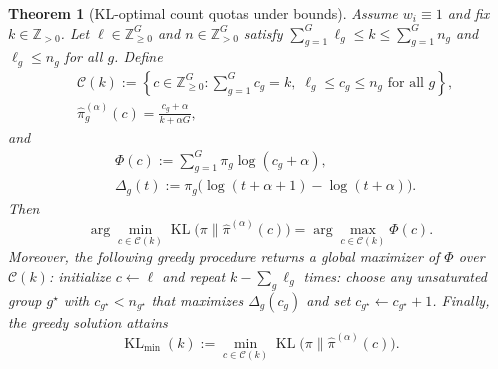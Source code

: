 \documentclass[10pt,journal]{IEEEtran}
\newcommand{\1}{\mathbf{1}}
\DeclareMathOperator{\KL}{KL}
\theoremstyle{ieeethm}
\newtheorem{theorem}{Theorem}
\begin{document}
\begin{theorem}[KL-optimal count quotas under bounds]
\label{thm:quota}
Assume $w_i\equiv 1$ and fix $k\in\mathbb{Z}_{>0}$. Let $\ell\in\mathbb{Z}_{\ge 0}^G$ and $n\in\mathbb{Z}_{>0}^G$
satisfy $\sum_{g=1}^G \ell_g \le k \le \sum_{g=1}^G n_g$ and $\ell_g\le n_g$ for all $g$.
Define
\begin{equation*}
\begin{aligned}
&\mathcal{C}(k):=
\left\{
c\in\mathbb{Z}_{\ge 0}^G :
\sum_{g=1}^G c_g=k,\;
\ell_g\le c_g\le n_g \text{ for all } g
\right\},
\\
&\hat\pi_g^{(\alpha)}(c)=\frac{c_g+\alpha}{k+\alpha G},
\end{aligned}
\end{equation*}
and
\begin{equation*}
\begin{aligned}
&\Phi(c):=\sum_{g=1}^G \pi_g\log(c_g+\alpha),
\\
&\Delta_g(t):=\pi_g\Big(\log(t+\alpha+1)-\log(t+\alpha)\Big).
\end{aligned}
\end{equation*}
Then
\[
\arg\min_{c\in\mathcal{C}(k)}\KL\!\big(\pi\big\|\hat\pi^{(\alpha)}(c)\big)
=
\arg\max_{c\in\mathcal{C}(k)}\Phi(c).
\]
Moreover, the following greedy procedure returns a global maximizer of $\Phi$ over $\mathcal{C}(k)$:
initialize $c\leftarrow \ell$ and repeat $k-\sum_g\ell_g$ times: choose any unsaturated group $g^\star$ with
$c_{g^\star}<n_{g^\star}$ that maximizes $\Delta_g(c_g)$ and set $c_{g^\star}\leftarrow c_{g^\star}+1$.
Finally, the greedy solution attains
\[
\KL_{\min}(k):=\min_{c\in\mathcal{C}(k)}\KL\!\big(\pi\big\|\hat\pi^{(\alpha)}(c)\big).
\]
\end{theorem}
\end{document}
